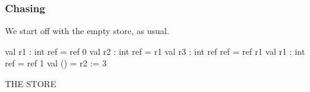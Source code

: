 \documentclass[aspectratio=169]{beamer}
\newcommand{\topthing}[2]{
      \begin{minipage}[t][#1][t]{\textwidth}
        \vspace{\fill}
        #2
        \vspace{\fill}
      \end{minipage}
    }
\begin{document}
\begin{frame}[fragile]
  \frametitle{ Chasing}

  \topthing{0.2in}{
    We start off with the empty store, as usual.
  }

  \vspace{10pt}

  \begin{center}
    \begin{minipage}[t][2.1in][t]{0.6\textwidth}
      \vspace{\fill}
      \begin{codeblock}
        val r1 : int ref     = ref 0
        val r2 : int ref     = r1
        val r3 : int ref ref = ref r1
        val r1 : int ref     = ref 1
        val ()               = r2 := 3
      \end{codeblock}
      \vspace{\fill}
    \end{minipage}
    \hfill\vline\hfill
    \begin{minipage}[t][2.1in][t]{0.3\textwidth}
      \centering
      {\hspace{-20pt}\color{gray} \large THE STORE}

      \vspace{\fill}
      \begin{tikzpicture}
      \end{tikzpicture}
      \vspace{\fill}
    \end{minipage}
  \end{center}
\end{frame}
\end{document}
